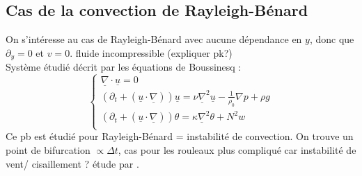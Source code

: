 \subsection{Cas de la convection de Rayleigh-Bénard}
On s'intéresse au cas de Rayleigh-Bénard avec aucune dépendance en $y$, donc que $\partial_y = 0$ et $v=0$. 
fluide incompressible (expliquer pk?)\\
Système étudié décrit par les équations de Boussinesq : 
\begin{equation}
 	\begin{cases}
 		\underline \nabla \cdot \underline u = 0 \\
 		\left(\partial_t  + (\underline u \cdot \underline \nabla) \right) \underline u = \nu \underline \nabla ^2 \underline u - \frac{1}{\rho_0} \nabla p + \rho g \\
 		\left(\partial_t  + (\underline u \cdot \underline \nabla) \right) \theta = \kappa \underline \nabla ^2 \theta + N^2 w   \\
 	\end{cases}
 \end{equation}
Ce pb est étudié pour Rayleigh-Bénard = instabilité de convection. On trouve un point de bifurcation $\propto \Delta t$, cas pour les rouleaux plus compliqué car instabilité de vent/ cisaillement ? étude par \cite{liu_analytical_2009}.
